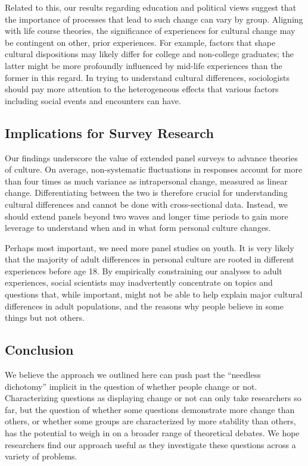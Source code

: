 \documentclass[
  11pt,
]{article}
\begin{document}
Related to this, our results regarding education and political views
suggest that the importance of processes that lead to such change can
vary by group. Aligning with life course theories, the significance of
experiences for cultural change may be contingent on other, prior
experiences. For example, factors that shape cultural dispositions may
likely differ for college and non-college graduates; the latter might be
more profoundly influenced by mid-life experiences than the former in
this regard. In trying to understand cultural differences, sociologists
should pay more attention to the heterogeneous effects that various
factors including social events and encounters can have.

\subsection{Implications for Survey
Research}\label{implications-for-survey-research}

Our findings underscore the value of extended panel surveys to advance
theories of culture. On average, non-systematic fluctuations in
responses account for more than four times as much variance as
intrapersonal change, measured as linear change. Differentiating between
the two is therefore crucial for understanding cultural differences and
cannot be done with cross-sectional data. Instead, we should extend
panels beyond two waves and longer time periods to gain more leverage to
understand when and in what form personal culture changes.

Perhaps most important, we need more panel studies on youth. It is very
likely that the majority of adult differences in personal culture are
rooted in different experiences before age 18. By empirically
constraining our analyses to adult experiences, social scientists may
inadvertently concentrate on topics and questions that, while important,
might not be able to help explain major cultural differences in adult
populations, and the reasons why people believe in some things but not
others.

\subsection{Conclusion}\label{conclusion}

We believe the approach we outlined here can push past the ``needless
dichotomy'' implicit in the question of whether people change or not.
Characterizing questions as displaying change or not can only take
researchers so far, but the question of whether some questions
demonstrate more change than others, or whether some groups are
characterized by more stability than others, has the potential to weigh
in on a broader range of theoretical debates. We hope researchers find
our approach useful as they investigate these questions across a variety
of problems.
\end{document}
